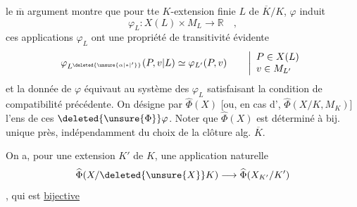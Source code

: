 le $\overline{\mathrm m}$ argument montre que pour tte $K$-extension finie $L$ de $\overline K/K$, $\varphi$ induit
\[
\varphi_L:X(L)\times M_L\longrightarrow\mathbb R\quad,
\]
ces applications $\varphi_L$ ont une propriété de transitivité évidente
\[
\varphi_{L^{\deleted{\unsure{\alpha|*|'}}}}(P,v|L)\simeq\varphi_{L'}(P,v)
\qquad\left|\begin{array}{l}P\in X(L)\\ v\in M_{L'}\end{array}\right.
\]
et la donnée de $\varphi$ équivaut au système des $\varphi_L$ satisfaisant la condition de compatibilité précédente. On  désigne par $\widehat{\Phi}(X)$ [ou, en cas d', $\widehat{\Phi}(X/K,M_K)$] l'ens de ces $\deleted{\unsure{\Phi}}\varphi$. Noter que $\widehat{\Phi}(X)$ est déterminé à bij. unique près, indépendamment du choix de la clôture alg. $\overline K$.

On a, pour une extension  $K'$ de $K$, une application naturelle
\[
\widehat{\Phi}(X/\deleted{\unsure{X}}K)\longrightarrow\widehat{\Phi}(X_{K'}/K')
\]
, qui est \uline{bijective}
